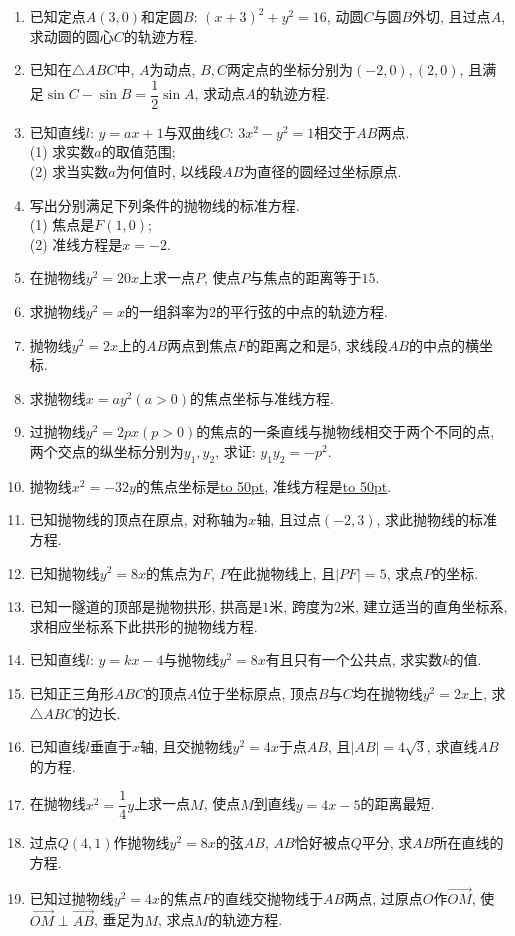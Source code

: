 \documentclass[10pt,a4paper]{article}
\newcommand{\blank}[1]{\underline{\hbox to #1pt{}}}
\begin{document}
\begin{enumerate}[1.]
\item 已知定点$A(3,0)$和定圆$B$: $(x+3)^2+y^2=16$, 动圆$C$与圆$B$外切, 且过点$A$, 求动圆的圆心$C$的轨迹方程.
\item 已知在$\triangle ABC$中, $A$为动点, $B,C$两定点的坐标分别为$(-2,0),(2,0)$, 且满足$\sin C-\sin B=\dfrac 12\sin A$, 求动点$A$的轨迹方程.
\item 已知直线$l$: $y=ax+1$与双曲线$C$: $3x^2-y^2=1$相交于$AB$两点.\\
(1) 求实数$a$的取值范围;\\
(2) 求当实数$a$为何值时, 以线段$AB$为直径的圆经过坐标原点.
\item 写出分别满足下列条件的抛物线的标准方程.\\
(1) 焦点是$F(1,0)$;\\
(2) 准线方程是$x=-2$.
\item 在抛物线$y^2=20x$上求一点$P$, 使点$P$与焦点的距离等于$15$.
\item 求抛物线$y^2=x$的一组斜率为$2$的平行弦的中点的轨迹方程.
\item 抛物线$y^2=2x$上的$AB$两点到焦点$F$的距离之和是$5$, 求线段$AB$的中点的横坐标.
\item 求抛物线$x=ay^2(a>0)$的焦点坐标与准线方程.
\item 过抛物线$y^2=2px(p>0)$的焦点的一条直线与抛物线相交于两个不同的点, 两个交点的纵坐标分别为$y_1,y_2$, 求证: $y_1y_2=-p^2$.
\item 抛物线$x^2=-32y$的焦点坐标是\blank{50}, 准线方程是\blank{50}.
\item 已知抛物线的顶点在原点, 对称轴为$x$轴, 且过点$(-2,3)$, 求此抛物线的标准方程.
\item 已知抛物线$y^2=8x$的焦点为$F$, $P$在此抛物线上, 且$|PF|=5$, 求点$P$的坐标.
\item 已知一隧道的顶部是抛物拱形, 拱高是$1$米, 跨度为$2$米, 建立适当的直角坐标系, 求相应坐标系下此拱形的抛物线方程.
\item 已知直线$l$: $y=kx-4$与抛物线$y^2=8x$有且只有一个公共点, 求实数$k$的值.
\item 已知正三角形$ABC$的顶点$A$位于坐标原点, 顶点$B$与$C$均在抛物线$y^2=2x$上, 求$\triangle ABC$的边长.
\item 已知直线$l$垂直于$x$轴, 且交抛物线$y^2=4x$于点$AB$, 且$|AB|=4\sqrt 3$, 求直线$AB$的方程.
\item 在抛物线$x^2=\dfrac 14y$上求一点$M$, 使点$M$到直线$y=4x-5$的距离最短.
\item 过点$Q(4,1)$作抛物线$y^2=8x$的弦$AB$, $AB$恰好被点$Q$平分, 求$AB$所在直线的方程.
\item 已知过抛物线$y^2=4x$的焦点$F$的直线交抛物线于$AB$两点, 过原点$O$作$\overrightarrow {OM}$, 使$\overrightarrow {OM}\perp \overrightarrow {AB}$, 垂足为$M$, 求点$M$的轨迹方程.

\end{enumerate}
\end{document}
